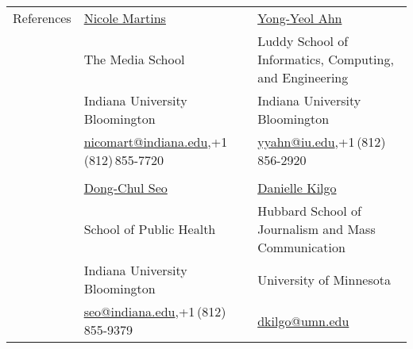 \documentclass{resume}
\begin{document}
\noindent \begin{tabular}{@{} l l l}
 \Large{References} & \href{https://mediaschool.indiana.edu/people/profile.html?p=nicomart}{Nicole Martins} & \href{http://yongyeol.com/}{Yong-Yeol Ahn} \\
 & The Media School &  Luddy School of Informatics, Computing, and Engineering  \\
 & Indiana University Bloomington &  Indiana University Bloomington \\
 & \small{\href{mailto:nicomart@indiana.edu}{nicomart@indiana.edu},+1\,(812)\,855-7720} & \small{\href{mailto:yyahn@iu.edu}{yyahn@iu.edu},+1\,(812)\,856-2920} \\
&& \\
 & \href{https://publichealth.indiana.edu/research/faculty-directory/profile.html?user=seo}{Dong-Chul Seo} & \href{https://www.daniellekilgo.com/}{Danielle Kilgo}  \\
 & School of Public Health &  Hubbard School of Journalism and Mass Communication \\
 & Indiana University Bloomington &  University of Minnesota \\
 & \small{\href{mailto:seo@indiana.edu}{seo@indiana.edu},+1\,(812)\,855-9379} & \small{\href{mailto:dkilgo@umn.edu}{dkilgo@umn.edu}} \\
\end{tabular}
\end{document}
